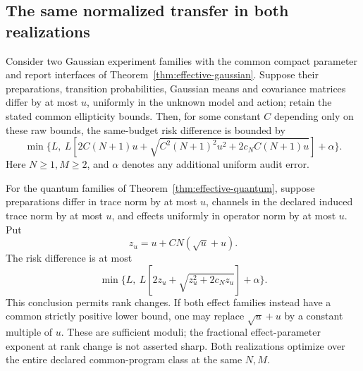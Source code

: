 \subsection{The same normalized transfer in both realizations}
\begin{corollary}\label{cor:raw-normalized}
Consider two Gaussian experiment families with the common compact parameter and report interfaces of Theorem~\ref{thm:effective-gaussian}. Suppose their preparations, transition probabilities, Gaussian means and covariance matrices differ by at most $u$, uniformly in the unknown model and action; retain the stated common ellipticity bounds. Then, for some constant $C$ depending only on these raw bounds, the same-budget risk difference is bounded by
\begin{equation}\label{eq:gaussian-normalized}
 \min\{L,\ L[2C(N+1)u+\sqrt{C^2(N+1)^2u^2+2c_NC(N+1)u}]+\alpha\}.
\end{equation}
Here $N\ge1,M\ge2$, and $\alpha$ denotes any additional uniform audit error.

For the quantum families of Theorem~\ref{thm:effective-quantum}, suppose preparations differ in trace norm by at most $u$, channels in the declared induced trace norm by at most $u$, and effects uniformly in operator norm by at most $u$. Put
\[
 z_u=u+CN(\sqrt u+u).
\]
The risk difference is at most
\begin{equation}\label{eq:quantum-normalized}
 \min\{L,\ L[2z_u+\sqrt{z_u^2+2c_Nz_u}]+\alpha\}.
\end{equation}
This conclusion permits rank changes. If both effect families instead have a common strictly positive lower bound, one may replace $\sqrt u+u$ by a constant multiple of $u$. These are sufficient moduli; the fractional effect-parameter exponent at rank change is not asserted sharp. Both realizations optimize over the entire declared common-program class at the same $N,M$.
\end{corollary}
